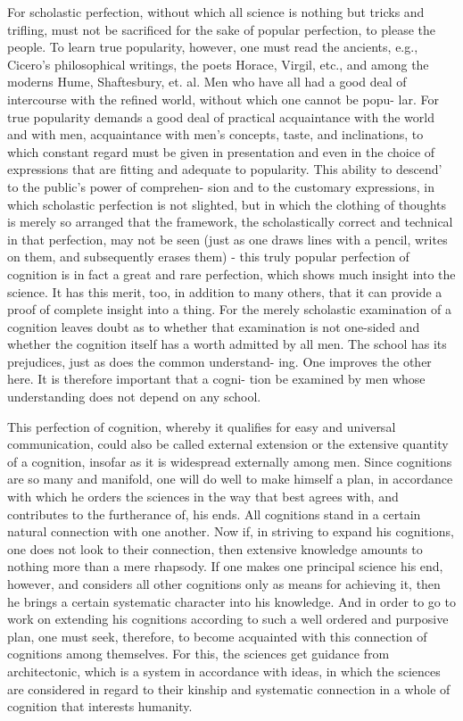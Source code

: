 For scholastic perfection, without which all science is nothing but tricks
and trifling, must not be sacrificed for the sake of popular perfection, to
please the people.
To learn true popularity, however, one must read the ancients, e.g.,
Cicero's philosophical writings, the poets Horace, Virgil, etc., and among
the moderns Hume, Shaftesbury, et. al. Men who have all had a good deal
of intercourse with the refined world, without which one cannot be popu-
lar. For true popularity demands a good deal of practical acquaintance
with the world and with men, acquaintance with men's concepts, taste,
and inclinations, to which constant regard must be given in presentation
and even in the choice of expressions that are fitting and adequate to
popularity. This ability to descend' to the public's power of comprehen-
sion and to the customary expressions, in which scholastic perfection is
not slighted, but in which the clothing of thoughts is merely so arranged
that the framework, the scholastically correct and technical in that perfection,
may not be seen (just as one draws lines with a pencil, writes on them, and
subsequently erases them) - this truly popular perfection of cognition is
in fact a great and rare perfection, which shows much insight into the
science. It has this merit, too, in addition to many others, that it can
provide a proof of complete insight into a thing. For the merely scholastic
examination of a cognition leaves doubt as to whether that examination is
not one-sided and whether the cognition itself has a worth admitted by all
men. The school has its prejudices, just as does the common understand-
ing. One improves the other here. It is therefore important that a cogni-
tion be examined by men whose understanding does not depend on any
school.

This perfection of cognition, whereby it qualifies for easy and universal
communication, could also be called external extension or the extensive
quantity of a cognition, insofar as it is widespread externally among men.
Since cognitions are so many and manifold, one will do well to make
himself a plan, in accordance with which he orders the sciences in the way
that best agrees with, and contributes to the furtherance of, his ends. All
cognitions stand in a certain natural connection with one another. Now if,
in striving to expand his cognitions, one does not look to their connection,
then extensive knowledge amounts to nothing more than a mere rhapsody.
If one makes one principal science his end, however, and
considers all other cognitions only as means for achieving it,
then he brings a certain systematic character into his knowledge.
And in order to go to work on extending his cognitions
according to such a well ordered and purposive plan,
one must seek, therefore, to become acquainted with
this connection of cognitions among themselves.
For this, the sciences get guidance from architectonic,
which is a system in accordance with ideas,
in which the sciences are considered in regard to their kinship and
systematic connection in a whole of cognition that interests humanity.

